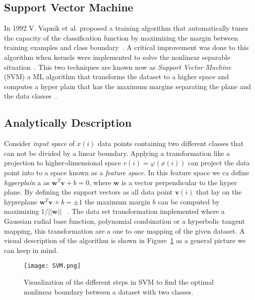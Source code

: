 \subsection{Support Vector Machine}




In 1992 V. Vapnik et al. proposed a training algorithm that automatically tunes the capacity of the classification function by maximizing the margin between training examples and class boundary~\cite{boser1992training}. A critical improvement was done to this algorithm when kernels were implemented to solve the nonlinear separable situation~\cite{smola1998learning}. This two techniques are known now as \textit{Support Vector Machine} (SVM) a ML algorithm that transforms the dataset to a higher space and computes a hyper plain that has the maximum margins separating the plane and the data classes~\cite{marsland2014machine}.~\\

\subsection{Analytically Description}

 Consider \textit{input space} of $x(i)$ data points containing two different classes that can not be divided by a linear boundary. Applying a transformation like a projection to higher-dimensional space $v(i)=\varphi(x(i))$ can project the data point into to a space known as a \textit{feature space}. In this feature space we ca define \textit{hyperplain} a as $\textbf{w}^{T}\textbf{v}+b=0$, where $\textbf{w}$ is a vector perpendicular to the hyper plane. By defining the support vectors  as all data point $\textbf{v}(i)$ that lay on the hypreplane  $\textbf{w}^{T}\textbf{v}+b=\pm 1$ the maximum margin $b$ can be computed by maximizing $1/||\textbf{w}||$ ~\cite{marsland2014machine,Nonparameter,khan2019optical}. The data set transformation implemented where a Gaussian radial base function, polynomial combination or a hyperbolic tangent mapping, this transformation are a one to one mapping of the given dataset. A visual description of the algorithm is shown in Figure~\ref{fig:SVMshow} as a general picture we can keep in mind.~\\  
\begin{figure}[h]
\centering
\texttt{[image: SVM.png]}
\caption{Visualization of the different steps in SVM to find the optimal nonlinear boundary between a dataset with two classes.}
\label{fig:SVMshow}
\end{figure}

